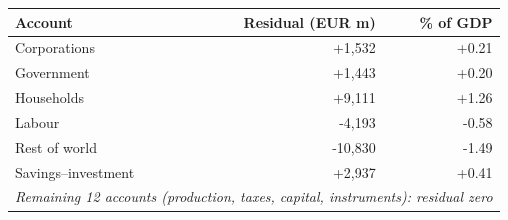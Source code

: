 \begin{tabular}{lrr}
\toprule
Account & Residual (EUR m) & \% of GDP \\
\midrule
Corporations & +1,532 & +0.21 \\
Government & +1,443 & +0.20 \\
Households & +9,111 & +1.26 \\
Labour & -4,193 & -0.58 \\
Rest of world & -10,830 & -1.49 \\
Savings--investment & +2,937 & +0.41 \\
\midrule
\multicolumn{3}{l}{\emph{Remaining 12 accounts (production, taxes, capital, instruments): residual zero}} \\
\bottomrule
\end{tabular}
